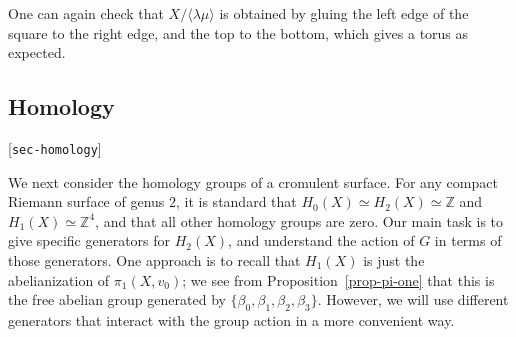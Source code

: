 \documentclass[reqno]{amsart}
\newcommand{\lbl}[1]{\label{#1}\textup{[\texttt{#1}]}\par}
\newcommand{\lbl}{\label}
\newcommand{\bt}        {\beta}
\newcommand{\lm}        {\lambda}
\newcommand{\Z}         {{\mathbb{Z}}}
\newcommand{\ip}[1]     {\langle #1\rangle}
\renewcommand{\ss}{\scriptstyle}
\renewcommand{\:}{\colon}
\theoremstyle{definition}
\begin{document}
\begin{center}
\end{center}
One can again check that $X/\ip{\lm\mu}$ is obtained by gluing the left
edge of the square to the right edge, and the top to the bottom, which
gives a torus as expected.

\subsection{Homology}
\lbl{sec-homology}

We next consider the homology groups of a cromulent surface.  For any
compact Riemann surface of genus $2$, it is standard that
$H_0(X)\simeq H_2(X)\simeq\Z$ and $H_1(X)\simeq\Z^4$, and that all
other homology groups are zero.  Our main task is to give specific
generators for $H_2(X)$, and understand the action of $G$ in terms of
those generators.  One approach is to recall that $H_1(X)$ is just the
abelianization of $\pi_1(X,v_0)$; we see from
Proposition~\ref{prop-pi-one} that this is the free abelian group
generated by $\{\bt_0,\bt_1,\bt_2,\bt_3\}$.  However, we will use
different generators that interact with the group action in a more
convenient way.
\end{document}
